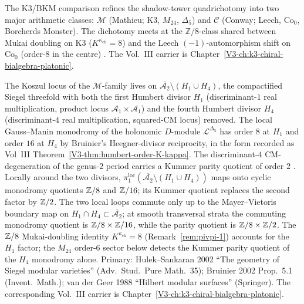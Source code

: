 \begin{remark}
\label{rem:pivpi-1}
The K3/BKM comparison refines the shadow-tower quadrichotomy into two
major arithmetic classes: $\mathcal M$ (Mathieu; K3, $M_{24}$, $\Delta_5$)
and $\mathcal C$ (Conway; Leech, $\mathrm{Co}_0$, Borcherds Monster).
The dichotomy meets at the $\mathbb Z/8$-class shared between Mukai
doubling on K3 ($K^{\kappa_{\mathrm{ch}}} = 8$) and the Leech
$(-1)$-automorphism shift on $\mathrm{Co}_0$ (order-$8$ in the centre)
\cite{ConwaySloane1988,Borcherds1998}. The Vol.~III carrier is
Chapter~\ref{V3-ch:k3-chiral-bialgebra-platonic}.
\end{remark}

\begin{remark}
\label{rem:pivpi-humbert-H4}
The Koszul locus of the $\mathcal M$-family lives on
$\overline{\mathcal A_2} \setminus (H_1 \cup H_4)$, the compactified
Siegel threefold with both the first Humbert divisor $H_1$
(discriminant-$1$ real multiplication, product locus
$\mathcal A_1 \times \mathcal A_1$) and the fourth Humbert divisor
$H_4$ (discriminant-$4$ real multiplication, squared-CM locus) removed.
The local Gauss--Manin monodromy of the holonomic $D$-module
$\mathcal L^{\Delta_5}$ has order $8$ at $H_1$ and order $16$ at
$H_4$ by Bruinier's Heegner-divisor reciprocity, in the form recorded
as Vol~III Theorem~\ref{V3-thm:humbert-order-K-kappa}. The
discriminant-$4$ CM-degeneration of the genus-$2$ period carries a
Kummer parity quotient of order $2$
\cite{HulekSankaran2002,vdGeer1988}. Locally around the two divisors,
$\pi_1^{\mathrm{loc}}(\overline{\mathcal A_2} \setminus
(H_1 \cup H_4))$ maps onto cyclic monodromy quotients
$\mathbb{Z}/8$ and $\mathbb{Z}/16$; its Kummer quotient replaces the second factor by
$\mathbb{Z}/2$. The two local loops commute only up to the Mayer--Vietoris
boundary map on $H_1 \cap H_4 \subset \overline{\mathcal A_2}$; at
smooth transversal strata the commuting monodromy quotient is
$\mathbb{Z}/8 \times \mathbb{Z}/16$, while the parity quotient is
$\mathbb{Z}/8 \times \mathbb{Z}/2$. The $\mathbb{Z}/8$ Mukai-doubling identity
$K^{\kappa_{\mathrm{ch}}} = 8$ (Remark~\ref{rem:pivpi-1}) accounts
for the $H_1$ factor; the $M_{24}$ order-$6$ sector below detects the
Kummer parity quotient of the $H_4$ monodromy alone. Primary:
Hulek--Sankaran 2002 ``The geometry of Siegel modular varieties''
(Adv.\ Stud.\ Pure Math.\ 35); Bruinier 2002 Prop.\ 5.1 (Invent.\ Math.);
van der Geer 1988 ``Hilbert modular surfaces'' (Springer). The
corresponding Vol.~III carrier is
Chapter~\ref{V3-ch:k3-chiral-bialgebra-platonic}.
\end{remark}

